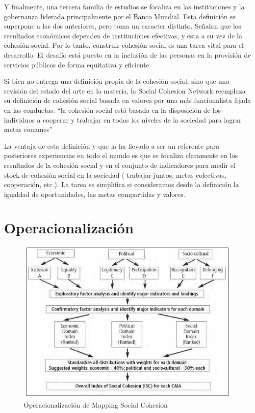 \documentclass[
  12pt,
]{book}
\begin{document}
Y finalmente, una tercera familia de estudios se focaliza en las
instituciones y la gobernanza liderada principalmente por el Banco
Mundial. Esta definición se superpone a las dos anteriores, pero toma un
caracter distinto. Señalan que los resultados económicos dependen de
instituciones efectivas, y esta a su vez de la cohesión social. Por lo
tanto, construir cohesión social es una tarea vital para el desarrollo.
El desafío está puesto en la inclusión de las personas en la provisión
de servicios públicos de forma equitativa y eficiente.

Si bien \citet{jenson2010defining} no entrega una definición propia de la
cohesión social, sino que una revisión del estado del arte en la
materia, la Social Cohesion Network reemplaza su definición de cohesión
social basada en valores por una más funcionalista fijada en las
conductas: ``la cohesión social está basada en la disposición de los
individuos a cooperar y trabajar en todos los niveles de la sociedad
para lograr metas comunes'' \citep{Jeannote2003}

La ventaja de esta definición y que la ha llevado a ser un referente
para posteriores experiencias en todo el mundo es que se focaliza
claramente en los resultados de la cohesión social y en el conjunto de
indicadores para medir el stock de cohesión social en la sociedad (
trabajar juntos, metas colectivas, cooperación, etc.). La tarea se
simplifica si consideramos desde la definición la igualdad de
oportunidades, las metas compartidas y valores.

\hypertarget{operacionalizaciuxf3n}{%
\section{Operacionalización}\label{operacionalizaciuxf3n}}

\begin{figure}[H]

{\centering \includegraphics[width=0.75\linewidth]{inputs/images/mapping} 

}

\caption{Operacionalización de Mapping Social Cohesion}\label{fig:mapping}
\end{figure}
\end{document}
